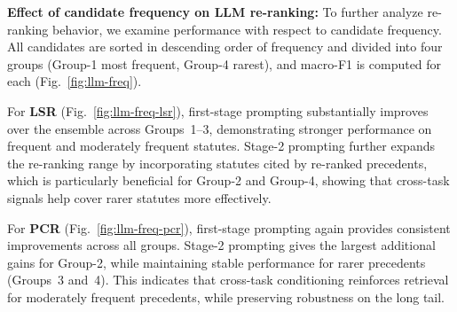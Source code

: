 \noindent\textbf{Effect of candidate frequency on LLM re-ranking:}   
To further analyze re-ranking behavior, we examine performance with respect to candidate frequency. All candidates are sorted in descending order of frequency and divided into four groups (Group-1 most frequent, Group-4 rarest), and macro-F1 is computed for each (Fig.~\ref{fig:llm-freq}).  

\noindent For \textbf{LSR} (Fig.~\ref{fig:llm-freq-lsr}), first-stage prompting substantially improves over the ensemble across Groups~1--3, demonstrating stronger performance on frequent and moderately frequent statutes. Stage-2 prompting further expands the re-ranking range by incorporating statutes cited by re-ranked precedents, which is particularly beneficial for Group-2 and Group-4, showing that cross-task signals help cover rarer statutes more effectively.  

\noindent For \textbf{PCR} (Fig.~\ref{fig:llm-freq-pcr}), first-stage prompting again provides consistent improvements across all groups. Stage-2 prompting gives the largest additional gains for Group-2, while maintaining stable performance for rarer precedents (Groups~3 and~4). This indicates that cross-task conditioning reinforces retrieval for moderately frequent precedents, while preserving robustness on the long tail.  

